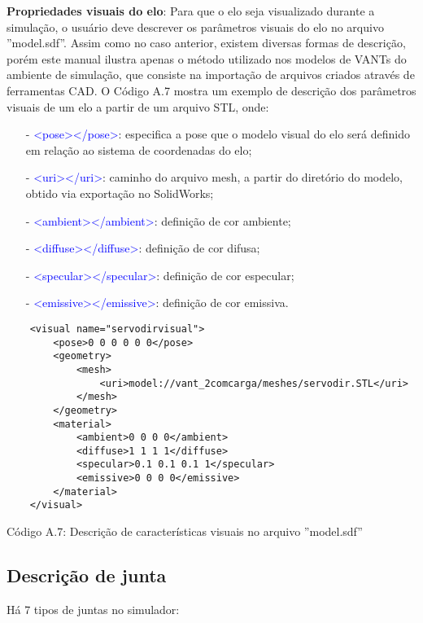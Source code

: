 \noindent \textbf{Propriedades visuais do elo}: Para que o elo seja visualizado durante a simulação, o usuário deve descrever os parâmetros visuais do elo no arquivo ''model.sdf''. Assim como no caso anterior, existem diversas formas de descrição, porém este manual ilustra apenas o método utilizado nos modelos de VANTs do ambiente de simulação, que consiste na importação de arquivos criados através de ferramentas CAD. O Código A.7 mostra um exemplo de descrição dos parâmetros visuais de um elo a partir de um arquivo STL, 	
onde: \small
\begin{itemize}
\setlength{\itemsep}{1pt}
\setlength{\parskip}{0pt}
\setlength{\parsep}{0pt}
\item[-] \textcolor{blue}{<pose></pose>}: especifica a pose que o modelo visual do elo será definido em relação ao sistema de coordenadas do elo;
\item[-] \textcolor{blue}{<uri></uri>}: caminho do arquivo mesh, a partir do diretório do modelo, obtido via exportação no SolidWorks;
\item[-] \textcolor{blue}{<ambient></ambient>}: definição de cor ambiente;
\item[-] \textcolor{blue}{<diffuse></diffuse>}: definição de cor difusa;
\item[-] \textcolor{blue}{<specular></specular>}: definição de cor especular;
\item[-] \textcolor{blue}{<emissive></emissive>}: definição de cor emissiva.
\end{itemize} \normalsize


	\begin{verbatim}
	<visual name="servodirvisual">
		<pose>0 0 0 0 0 0</pose>
		<geometry>
			<mesh>
				<uri>model://vant_2comcarga/meshes/servodir.STL</uri>
			</mesh>
		</geometry>
		<material>
			<ambient>0 0 0 0</ambient>
			<diffuse>1 1 1 1</diffuse>
			<specular>0.1 0.1 0.1 1</specular>
			<emissive>0 0 0 0</emissive>
		</material>
	</visual>
	\end{verbatim}
	\centerline{Código A.7: Descrição de características visuais no arquivo ''model.sdf''}
	

\subsection{Descrição de junta} 

Há 7 tipos de juntas no simulador: 

